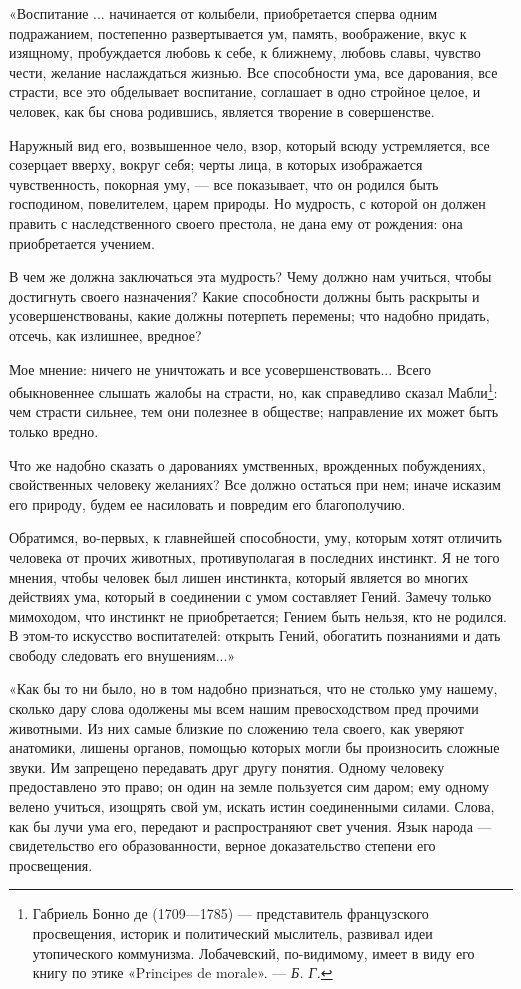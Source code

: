 \documentclass[12pt, a4paper, openany]{book}
\begin{document}
«Воспитание ... начинается от колыбели, приобретается сперва одним подражанием, постепенно развертывается ум, память, воображение, вкус к изящному, пробуждается любовь к себе, к ближнему, любовь славы, чувство чести, желание наслаждаться жизнью. Все способности ума, все дарования, все страсти, все это обделывает воспитание, соглашает в одно стройное целое, и человек, как бы снова родившись, является творение в совершенстве. 

Наружный вид его, возвышенное чело, взор, который всюду устремляется, все созерцает вверху, вокруг себя; черты лица, в которых изображается чувственность,  покорная уму, — все показывает, что он родился быть  господином, повелителем, царем природы. Но мудрость, с  которой он должен править с наследственного своего престола, не дана ему от рождения: она приобретается учением. 

В чем же должна заключаться эта мудрость? Чему  должно нам учиться, чтобы достигнуть своего назначения? Какие способности должны быть раскрыты и  усовершенствованы, какие должны потерпеть перемены; что надобно придать, отсечь, как излишнее, вредное? 


Мое мнение: ничего не уничтожать и все  усовершенствовать... Всего обыкновеннее слышать жалобы на страсти, но, как справедливо сказал Мабли{\footnote{Габриель Бонно де  (1709—1785) —  представитель французского просвещения, историк и политический мыслитель, развивал идеи утопического коммунизма. Лобачевский, по-видимому, имеет в виду его книгу по этике «Principes de morale». — \textit{Б. Г.}}}: чем страсти сильнее, тем они полезнее в обществе; направление их может быть только вредно. 


Что же надобно сказать о дарованиях умственных,  врожденных побуждениях, свойственных человеку желаниях? Все должно остаться при нем; иначе исказим его природу, будем ее насиловать и повредим его благополучию. 

Обратимся, во-первых, к главнейшей способности, уму, которым хотят отличить человека от прочих животных, противуполагая в последних инстинкт. Я не того мнения, чтобы человек был лишен инстинкта, который является во многих действиях ума, который в соединении с умом  составляет Гений. Замечу только мимоходом, что инстинкт не приобретается; Гением быть нельзя, кто не родился. В этом-то искусство воспитателей: открыть Гений,  обогатить познаниями и дать свободу следовать его внушениям...» 

«Как бы то ни было, но в том надобно признаться, что не столько уму нашему, сколько дару слова одолжены мы всем нашим превосходством пред прочими животными. Из них самые близкие по сложению тела своего, как уверяют анатомики, лишены органов, помощью которых могли бы  произносить сложные звуки. Им запрещено передавать друг другу понятия. Одному человеку предоставлено это право; он один на земле пользуется сим даром; ему одному велено учиться, изощрять свой ум, искать истин соединенными силами. Слова, как бы лучи ума его, передают и  распространяют свет учения. Язык народа — свидетельство его образованности, верное доказательство степени его  просвещения. 
\end{document}
